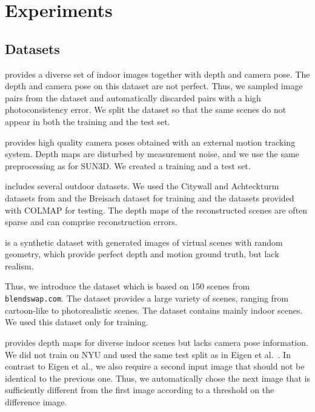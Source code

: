 \documentclass[10pt,twocolumn,letterpaper]{article}
\begin{document}
\section{Experiments}


\subsection{Datasets}

 \cite{xiao_sun3d_2013} provides a diverse set of indoor images together with depth and camera pose.
The depth and camera pose on this dataset are not perfect.
Thus, we sampled image pairs from the dataset and automatically discarded pairs with a high photoconsistency error. We split the dataset so that the same scenes do not appear in both the training and the test set.

 \cite{sturm12iros} provides high quality camera poses obtained with an external motion tracking system.
Depth maps are disturbed by measurement noise, and we use the same preprocessing as for SUN3D. We created a training and a test set. 

 includes several outdoor datasets. We used the Citywall and Achteckturm datasets from \cite{fuhrmann2014mve} and the Breisach dataset \cite{UB15} for training and the datasets provided with COLMAP \cite{schoenberger2016sfm,schoenberger2016mvs} for testing. The depth maps of the reconstructed scenes are often sparse and can comprise reconstruction errors.

 is a synthetic dataset with generated images of virtual scenes with random geometry, which provide perfect depth and motion ground truth, but lack realism. 

Thus, we introduce the  dataset which is based on 150 scenes from \texttt{blendswap.com}.
The dataset provides a large variety of scenes, ranging from cartoon-like to photorealistic scenes.
The dataset contains mainly indoor scenes. We used this dataset only for training. 

 \cite{NYU} provides depth maps for diverse indoor scenes but lacks camera pose information.
We did not train on NYU and used the same test split as in Eigen et al.~\cite{eigen_predicting_2015}.
In contrast to Eigen et al., we also require a second input image that should not be identical to the previous one. Thus, we automatically chose the next image that is sufficiently different from the first image according to a threshold on the difference image.
\end{document}
